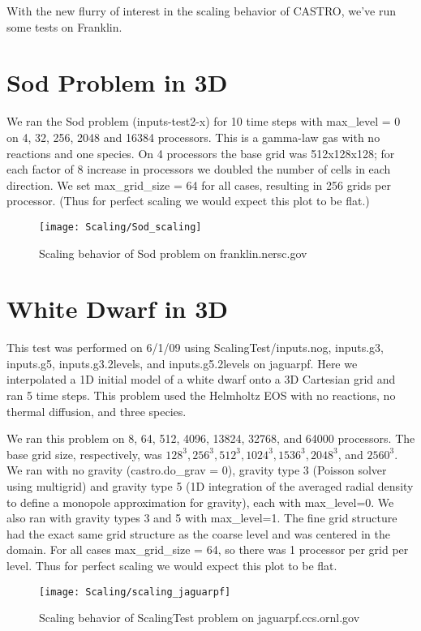 With the new flurry of interest in the scaling behavior of CASTRO, we've run some tests on Franklin.
\section{Sod Problem in 3D}
We ran the Sod problem (inputs-test2-x) for 10 time steps with max\_level = 0 on 4, 32, 256, 2048 and 16384 processors. This is a gamma-law gas with no reactions and one species. On 4 processors the base grid was 512x128x128; for each factor of 8 increase in processors we doubled the number of cells in each direction. We set max\_grid\_size = 64 for all cases, resulting in 256 grids per processor. (Thus for perfect scaling we would expect this plot to be flat.) 
\begin{figure}[h]
\centering
\texttt{[image: Scaling/Sod\_scaling]}
\caption{Scaling behavior of Sod problem on franklin.nersc.gov}
\end{figure}
\section{White Dwarf in 3D}\label{Sec:White Dwarf in 3D}
This test was performed on 6/1/09 using ScalingTest/inputs.nog, inputs.g3, inputs.g5, inputs.g3.2levels, and inputs.g5.2levels on jaguarpf.  Here we interpolated a 1D initial model of a white dwarf onto a 3D Cartesian grid and ran 5 time steps. This problem used the Helmholtz EOS with no reactions, no thermal diffusion, and three species.  

We ran this problem on 8, 64, 512, 4096, 13824, 32768, and 64000 processors.  The base grid size, respectively, was $128^3, 256^3, 512^3, 1024^3, 1536^3, 2048^3$, and $2560^3$.  We ran with no gravity (castro.do\_grav = 0), gravity type 3 (Poisson solver using multigrid) and gravity type 5 (1D integration of the averaged radial density to define a monopole approximation for gravity), each with max\_level=0.  We also ran with gravity types 3 and 5 with max\_level=1.  The fine grid structure had the exact same grid structure as the coarse level and was centered in the domain.  For all cases max\_grid\_size = 64, so there was 1 processor per grid per level.  Thus for perfect scaling we would expect this plot to be flat. 
\begin{figure}[h]
\centering
\texttt{[image: Scaling/scaling\_jaguarpf]}
\caption{Scaling behavior of ScalingTest problem on jaguarpf.ccs.ornl.gov}
\end{figure}
